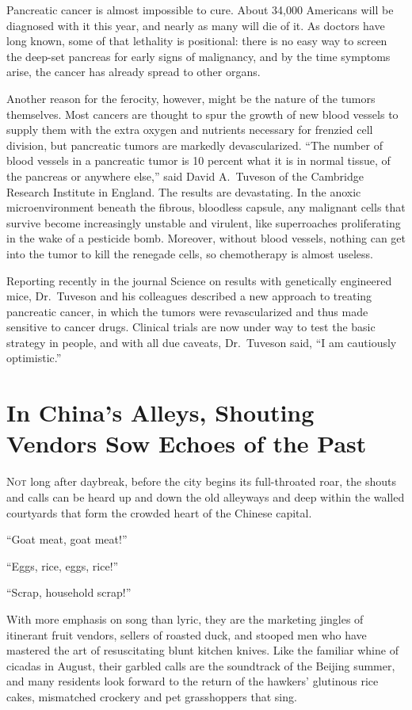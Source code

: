 ﻿\documentclass[12pt]{article}
\begin{document}
Pancreatic cancer is almost impossible to cure. About 34,000 Americans will be diagnosed with it
this year, and nearly as many will die of it. As doctors have long known, some of that lethality is
positional: there is no easy way to screen the deep-set pancreas for early signs of malignancy, and
by the time symptoms arise, the cancer has already spread to other organs.

Another reason for the ferocity, however, might be the nature of the tumors themselves. Most cancers
are thought to spur the growth of new blood vessels to supply them with the extra oxygen and
nutrients necessary for frenzied cell division, but pancreatic tumors are markedly devascularized.
``The number of blood vessels in a pancreatic tumor is 10 percent what it is in normal tissue, of
the pancreas or anywhere else,'' said David A.~Tuveson of the Cambridge Research Institute in
England. The results are devastating. In the anoxic microenvironment beneath the fibrous, bloodless
capsule, any malignant cells that survive become increasingly unstable and virulent, like
superroaches proliferating in the wake of a pesticide bomb. Moreover, without blood vessels, nothing
can get into the tumor to kill the renegade cells, so chemotherapy is almost useless.

Reporting recently in the journal Science on results with genetically engineered mice, Dr.~Tuveson
and his colleagues described a new approach to treating pancreatic cancer, in which the tumors were
revascularized and thus made sensitive to cancer drugs. Clinical trials are now under way to test
the basic strategy in people, and with all due caveats, Dr.~Tuveson said, ``I am cautiously
optimistic.''

\section{In China's Alleys, Shouting Vendors Sow Echoes of the Past}

\lettrine{N}{ot} long after daybreak, before the city begins its full-throated roar, the shouts and
calls can be heard up and down the old alleyways and deep within the walled courtyards that form the
crowded heart of the Chinese capital.

``Goat meat, goat meat!''

``Eggs, rice, eggs, rice!''

``Scrap, household scrap!''

With more emphasis on song than lyric, they are the marketing jingles of itinerant fruit vendors,
sellers of roasted duck, and stooped men who have mastered the art of resuscitating blunt kitchen
knives. Like the familiar whine of cicadas in August, their garbled calls are the soundtrack of the
Beijing summer, and many residents look forward to the return of the hawkers' glutinous rice cakes,
mismatched crockery and pet grasshoppers that sing.
\end{document}
